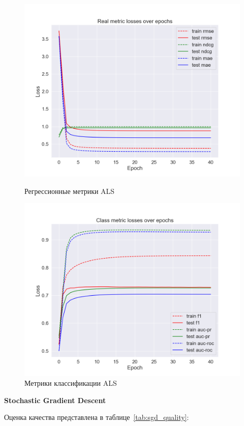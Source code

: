 \begin{figure}[h!]
\centering
\begin{minipage}{.5\textwidth}
\centering
\includegraphics[width=0.9\linewidth]{images/als/real_losses}
\caption{Регрессионные метрики ALS}
\label{fig:als_real_losses}
\end{minipage}%
\begin{minipage}{.5\textwidth}
\centering
\includegraphics[width=0.9\linewidth]{images/als/class_losses}
\caption{Метрики классификации ALS}
\label{fig:als_class_losses}
\end{minipage}
\end{figure}


\pagebreak
\textbf{Stochastic Gradient Descent}

Оценка качества представлена в таблице~\ref{tab:sgd_quality}:

